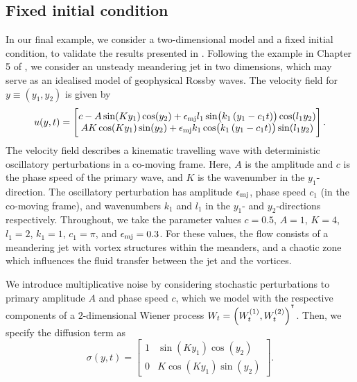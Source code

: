 \subsection{Fixed initial condition}\label{sec:numerics_2d}
In our final example, we consider a two-dimensional model and a fixed initial condition, to validate the results presented in .
Following the example in Chapter 5 of \cite{SamelsonWiggins_2006_LagrangianTransportGeophysical}, we consider an unsteady meandering jet in two dimensions, which may serve as an idealised model of geophysical Rossby waves.
The velocity field for \(y \equiv \left(y_1, y_2\right)\) is given by \cite{SamelsonWiggins_2006_LagrangianTransportGeophysical}
\begin{equation}
	u\!\left(y, t\right) = \begin{bmatrix}
		c - A\sin\!\left(Ky_1\right)\cos\!\left(y_2\right) + \oldepsilon_{\mathrm{mj}} l_1\sin\!\left(k_1\left(y_1 - c_1 t\right)\right)\cos\!\left(l_1 y_2\right) \\
		AK\cos\!\left(Ky_1\right)\sin\!\left(y_2\right) + \oldepsilon_{\mathrm{mj}} k_1\cos\!\left(k_1\left(y_1 - c_1t\right)\right)\sin\!\left(l_1 y_2\right)
	\end{bmatrix}.
 \label{eqn:jet_ex}
\end{equation}
The velocity field describes a kinematic travelling wave with deterministic oscillatory perturbations in a co-moving frame.
Here, \(A\) is the amplitude and \(c\) is the phase speed of the primary wave, and \(K\) is the wavenumber in the \(y_1\)-direction.
The oscillatory perturbation has amplitude \(\epsilon_{\mathrm{mj}}\), phase speed \(c_1\) (in the co-moving frame), and wavenumbers \(k_1\) and \(l_1\) in the \(y_1\)- and \(y_2\)-directions respectively.
Throughout, we take the parameter values \(c = 0.5\), \(A = 1\), \(K = 4\), \(l_1 = 2\), \(k_1 = 1\), \(c_1 = \pi\), and \(\epsilon_{\mathrm{mj}} = 0.3\).
For these values, the flow consists of a meandering jet with vortex structures within the meanders, and a chaotic zone
which influences the fluid transfer between the jet and the vortices.

We introduce multiplicative noise by considering stochastic perturbations to primary amplitude \(A\) and phase speed \(c\), which we model with the respective components of a \(2\)-dimensional Wiener process \(W_t = \left(W_t^{(1)}, W_t^{(2)}\right)^{^{\intercal}}\).
Then, we specify the diffusion term as
\begin{equation}
	\sigma\!\left(y,t\right) = \begin{bmatrix}
		1 & \sin\!\left(Ky_1\right)\cos\!\left(y_2\right) \\
		0 & K\cos\!\left(Ky_1\right)\sin\!\left(y_2\right)
	\end{bmatrix}.
	\label{eqn:jet_ex_sigma}
\end{equation}

